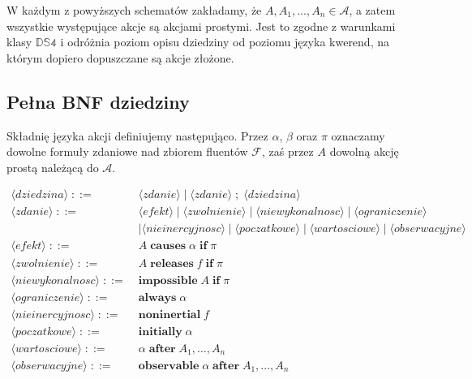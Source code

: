 \documentclass[11pt,a4paper]{article}
\theoremstyle{definition}
\begin{document}
W każdym z powyższych schematów zakładamy, że $A,A_1,\dots,A_n \in \mathcal{A}$, a zatem wszystkie występujące akcje są akcjami prostymi. Jest to zgodne z warunkami klasy $\mathbb{DS4}$ i odróżnia poziom opisu dziedziny od poziomu języka kwerend, na którym dopiero dopuszczane są akcje złożone.

\subsection{Pełna BNF dziedziny}

Składnię języka akcji definiujemy następująco. Przez $\alpha$, $\beta$ oraz $\pi$ oznaczamy dowolne formuły zdaniowe nad zbiorem fluentów $\mathcal{F}$, zaś przez $A$ dowolną akcję prostą należącą do $\mathcal{A}$.

\begin{align*}
\langle \textit{dziedzina} \rangle \;::=\;& \langle \textit{zdanie} \rangle
\mid \langle \textit{zdanie} \rangle \; ; \; \langle \textit{dziedzina} \rangle \\[4pt]
\langle \textit{zdanie} \rangle \;::=\;& \langle \textit{efekt} \rangle
\mid \langle \textit{zwolnienie} \rangle
\mid \langle \textit{niewykonalnosc} \rangle
\mid \langle \textit{ograniczenie} \rangle \\
&\mid \langle \textit{nieinercyjnosc} \rangle
\mid \langle \textit{poczatkowe} \rangle
\mid \langle \textit{wartosciowe} \rangle
\mid \langle \textit{obserwacyjne} \rangle \\[4pt]
\langle \textit{efekt} \rangle \;::=\;&
A \;\textbf{causes}\; \alpha \;\textbf{if}\; \pi \\[4pt]
\langle \textit{zwolnienie} \rangle \;::=\;&
A \;\textbf{releases}\; f \;\textbf{if}\; \pi \\[4pt]
\langle \textit{niewykonalnosc} \rangle \;::=\;&
\textbf{impossible}\; A \;\textbf{if}\; \pi \\[4pt]
\langle \textit{ograniczenie} \rangle \;::=\;&
\textbf{always}\; \alpha \\[4pt]
\langle \textit{nieinercyjnosc} \rangle \;::=\;&
\textbf{noninertial}\; f \\[4pt]
\langle \textit{poczatkowe} \rangle \;::=\;&
\textbf{initially}\; \alpha \\[4pt]
\langle \textit{wartosciowe} \rangle \;::=\;&
\alpha \;\textbf{after}\; A_1,\dots,A_n \\[4pt]
\langle \textit{obserwacyjne} \rangle \;::=\;&
\textbf{observable}\; \alpha \;\textbf{after}\; A_1,\dots,A_n
\end{align*}
\end{document}
